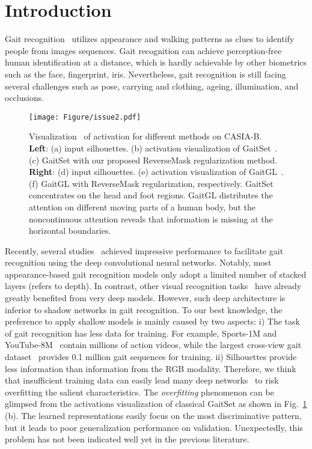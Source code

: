 \documentclass[runningheads]{llncs}
\begin{document}
\section{Introduction}
\label{sec:intro}


Gait recognition~\cite{nixon2010humanbook} utilizes appearance and walking patterns as clues to identify people from images sequences. Gait recognition can achieve perception-free human identification at a distance, which is hardly achievable by other biometrics such as the face, fingerprint, iris. Nevertheless, gait recognition is still facing several challenges such as pose\cite{ptsn}, carrying and clothing\cite{casiab}, ageing\cite{isir}, illumination, and occlusions.
    
\begin{figure}[ht!]
\centering
\texttt{[image: Figure/issue2.pdf]}
\centering
\caption{
Visualization~\cite{visualmethod} of activation for different methods on CASIA-B. \textbf{Left}: (a) input silhouettes. (b) activation visualization of GaitSet~\cite{aaai2019gaitset}. (c) GaitSet with our proposed ReverseMask regularization method. \textbf{Right}: (d) input silhouettes. (e) activation visualization of GaitGL~\cite{gaitgl}. (f) GaitGL with ReverseMask regularization, respectively.
GaitSet concentrates on the head and foot regions. GaitGL distributes the attention on different moving parts of a human body, but the noncontinuous attention reveals that information is missing at the horizontal boundaries. }
\label{fig:heatmap_firstpage}
\vspace{-5mm}
\end{figure}

Recently, several studies~\cite{shiraga2016geinet,wu2016comprehensive,20163dcnn,2019_part_zhangyuqi,MT3D} achieved impressive performance to facilitate gait recognition using the deep convolutional neural networks. Notably, most appearance-based gait recognition models only adopt a limited number of stacked layers (refers to depth). In contrast, other visual recognition tasks~\cite{action,he2021masked} have already greatly benefited from very deep models. However, such deep architecture is inferior to shadow networks in gait recognition. To our best knowledge, the preference to apply shallow models is mainly caused by two aspects: i) The task of gait recognition has less data for training. For example, Sports-1M and YouTube-8M~\cite{sports1m,youtube} contain millions of action videos, while the largest cross-view gait dataset~\cite{oumvlp} provides 0.1 million gait sequences for training. ii) Silhouettes provide less information than information from the RGB modality. Therefore, we think that insufficient training data can easily lead many deep networks~\cite{aaai2019gaitset,gln,disentangled2019cvprgaitnet} to risk overfitting the salient characteristics. The \textit{overfitting} phenomenon can be glimpsed from the activations visualization of classical GaitSet\cite{aaai2019gaitset} as shown in Fig.~\ref{fig:heatmap_firstpage} (b). The learned representations easily focus on the most discriminative pattern, but it leads to poor generalization performance on validation. Unexpectedly, this problem has not been indicated well yet in the previous literature.
    
\end{document}
